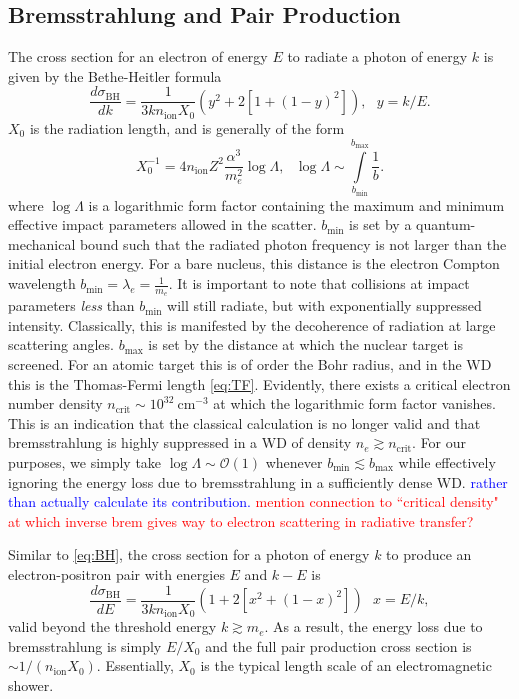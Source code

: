 \documentclass[twocolumn,showpacs,preprintnumbers,amsmath,amssymb,prd]{revtex4}
\newcommand{\OO}{\mathcal{O}}
\begin{document}
\begin{appendices}
\subsection*{Bremsstrahlung and Pair Production}
The cross section for an electron of energy $E$ to radiate a photon of energy $k$ is given by the Bethe-Heitler formula
\begin{equation}
\label{eq:BH}
\frac{d \sigma_\text{BH}}{dk} = \frac{1}{3 k n_\text{ion} X_0} (y^2+2 [1+ (1-y)^2]), ~~~ y = k/E.
\end{equation}
$X_0$ is the radiation length, and is generally of the form
\begin{equation}
X_0^{-1} = 4 n_\text{ion} Z^2 \frac{\alpha^3}{m_e^2} \log{\Lambda}, ~~~ \log{\Lambda} \sim \int \limits_{b_\text{min}}^{b_\text{max}} \frac{1}{b}.
\end{equation}
where $\log{\Lambda}$ is a logarithmic form factor containing the maximum and minimum effective impact parameters allowed in the scatter. $b_\text{min}$ is set by a quantum-mechanical bound such that the radiated photon frequency is not larger than the initial electron energy. For a bare nucleus, this distance is the electron Compton wavelength $b_\text{min} = \lambda_e = \frac{1}{m_e}$. It is important to note that collisions at impact parameters \emph{less} than $b_\text{min}$ will still radiate, but with exponentially suppressed intensity. Classically, this is manifested by the decoherence of radiation at large scattering angles. $b_\text{max}$ is set by the distance at which the nuclear target is screened. For an atomic target this is of order the Bohr radius, and in the WD this is the Thomas-Fermi length \eqref{eq:TF}. Evidently, there exists a critical electron number density $n_\text{crit} \sim 10^{32} ~\text{cm}^{-3}$ at which the logarithmic form factor vanishes. This is an indication that the classical calculation is no longer valid and that bremsstrahlung is highly suppressed in a WD of density $n_e \gtrsim n_\text{crit}$. For our purposes, we simply take $\log{\Lambda} \sim \OO(1)$ whenever $b_\text{min} \lesssim b_\text{max}$ while effectively ignoring the energy loss due to bremsstrahlung in a sufficiently dense WD. \textcolor{blue}{rather than actually calculate its contribution.} \textcolor{red}{mention connection to ``critical density" at which inverse brem gives way to electron scattering in radiative transfer?}

Similar to \eqref{eq:BH}, the cross section for a photon of energy $k$ to produce an electron-positron pair with energies $E$ and $k-E$ is
\begin{equation}
\label{eq:PP}
\frac{d \sigma_\text{BH}}{dE} = \frac{1}{3 k n_\text{ion} X_0} (1+ 2[x^2+ (1-x)^2]) ~~~ x = E/k,
\end{equation}
valid beyond the threshold energy $k \gtrsim m_e$. As a result, the energy loss due to bremsstrahlung is simply $E/X_0$ and the full pair production cross section is $\sim 1/(n_\text{ion} X_0)$. Essentially, $X_0$ is the typical length scale of an electromagnetic shower.


\end{appendices}
\end{document}
